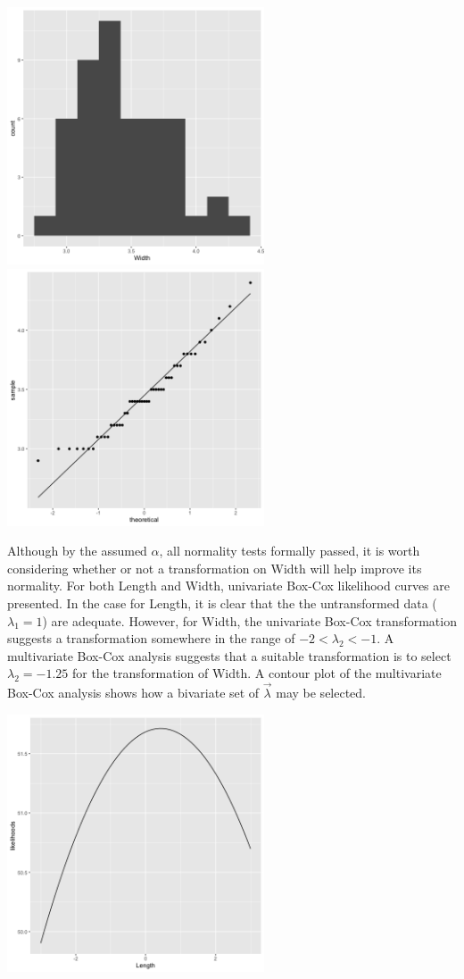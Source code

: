 \begin{enumerate}
\begin{center}
		\includegraphics[width=3in]{plot_4_b_W_hist.png}
		\includegraphics[width=3in]{plot_4_b_W_qq.png}
	\end{center}
	Although by the assumed $\alpha$, all normality tests formally passed, it is worth considering whether or not a transformation on Width will help improve its normality. For both Length and Width, univariate Box-Cox likelihood curves are presented. In the case for Length, it is clear that the the untransformed data ($\lambda_1 = 1$) are adequate. However, for Width, the univariate Box-Cox transformation suggests a transformation somewhere in the range of $-2 < \lambda_2 < -1$. A multivariate Box-Cox analysis suggests that a suitable transformation is to select $\lambda_2 = -1.25$ for the transformation of Width. A contour plot of the multivariate Box-Cox analysis shows how a bivariate set of $\vec{\lambda}$ may be selected.
	\begin{center}
		\includegraphics[width=3in]{plot_4_b_L_bxcx.png}

\end{center}
\end{enumerate}
